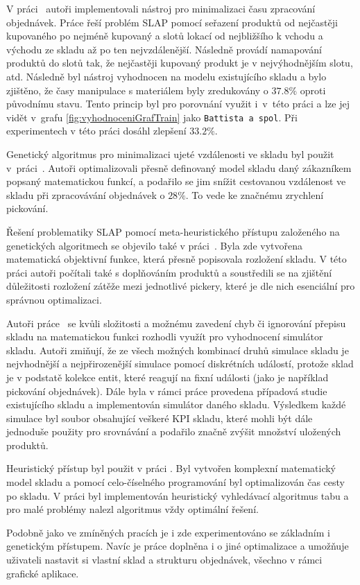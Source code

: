 V práci~\cite{slapSeacomp} autoři implementovali nástroj pro minimalizaci času zpracování objednávek. Práce řeší problém SLAP pomocí seřazení produktů od nejčastěji kupovaného po nejméně kupovaný a slotů lokací od nejbližšího k vchodu a východu ze skladu až po ten nejvzdálenější. Následně provádí namapování produktů do slotů tak, že nejčastěji kupovaný produkt je v nejvýhodnějším slotu, atd. Následně byl nástroj vyhodnocen na modelu existujícího skladu a bylo zjištěno, že časy manipulace s materiálem byly zredukovány o $37.8\%$ oproti původnímu stavu. Tento princip byl pro porovnání využit i~v~této práci a lze jej vidět v~grafu \ref{fig:vyhodnoceniGrafTrain} jako \texttt{Battista a spol}. Při experimentech v této práci dosáhl zlepšení $33.2\%$.

Genetický algoritmus pro minimalizaci ujeté vzdálenosti ve skladu byl použit v~práci~\cite{optimisationOrderPickingGA}. Autoři optimalizovali přesně definovaný model skladu daný zákazníkem popsaný matematickou funkcí, a podařilo se jim snížit cestovanou vzdálenost ve skladu při zpracovávání objednávek o $28\%$. To vede ke značnému zrychlení pickování.

Řešení problematiky SLAP pomocí meta-heuristického přístupu založeného na genetických algoritmech se objevilo také v práci~\cite{slapPickAndPass}. Byla zde vytvořena matematická objektivní funkce, která přesně popisovala rozložení skladu. V této práci autoři počítali také s doplňováním produktů a soustředili se na zjištění důležitosti rozložení zátěže mezi jednotlivé pickery, které je dle nich esenciální pro správnou optimalizaci.

Autoři práce~\cite{whModelSim} se kvůli složitosti a možnému zavedení chyb či ignorování přepisu skladu na matematickou funkci rozhodli využít pro vyhodnocení simulátor skladu. Autoři zmiňují, že ze všech možných kombinací druhů simulace skladu je nejvhodnější a nejpřirozenější simulace pomocí diskrétních událostí, protože sklad je v podstatě kolekce entit, které reagují na fixní události (jako je například pickování objednávek). Dále byla v rámci práce provedena případová studie existujícího skladu a implementován simulátor daného skladu. Výsledkem každé simulace byl soubor obsahující veškeré KPI skladu, které mohli být dále jednoduše použity pro srovnávání a podařilo značně zvýšit množství uložených produktů.

Heuristický přístup byl použit v práci \cite{exactTimeSlap}. Byl vytvořen komplexní matematický model skladu a pomocí celo-číselného programování byl optimalizován čas cesty po skladu. V práci byl implementován heuristický vyhledávací algoritmus tabu a pro malé problémy nalezl algoritmus vždy optimální řešení.

Podobně jako ve zmíněných pracích je i zde experimentováno se základním i genetickým přístupem. Navíc je práce doplněna i o jiné optimalizace a umožňuje uživateli nastavit si vlastní sklad a strukturu objednávek, všechno v rámci grafické aplikace.
